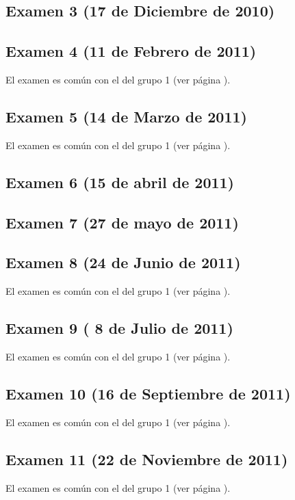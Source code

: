 \documentclass[a4paper,12pt,twoside]{book}
\begin{document}
\subsection{Examen 3 (17 de Diciembre de 2010)}
\subsection{Examen 4 (11 de Febrero de 2011)}
El examen es común con el del grupo 1 (ver página \pageref{examen_10_11_4_4}).
\subsection{Examen 5 (14 de Marzo de 2011)}
El examen es común con el del grupo 1 (ver página \pageref{examen_10_11_4_5}).
\subsection{Examen 6 (15 de abril de 2011)}
\subsection{Examen 7 (27 de mayo de 2011)}
\subsection{Examen 8 (24 de Junio de 2011)}
El examen es común con el del grupo 1 (ver página \pageref{examen_10_11_4_8}).
\subsection{Examen 9 ( 8 de Julio de 2011)}
El examen es común con el del grupo 1 (ver página \pageref{examen_10_11_4_9}).
\subsection{Examen 10 (16 de Septiembre de 2011)}
El examen es común con el del grupo 1 (ver página \pageref{examen_10_11_4_10}).
\subsection{Examen 11 (22 de Noviembre de 2011)}
El examen es común con el del grupo 1 (ver página \pageref{examen_10_11_4_11}).
\end{document}

